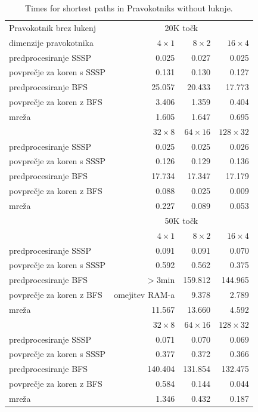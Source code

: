\documentclass[a4paper, 12pt]{book}
\begin{document}
\begin{table}
\begin{center}
\begin{tabular}{l*{3}{r}}
Pravokotnik brez lukenj & \multicolumn{3}{c}{20K točk}\\						
dimenzije pravokotnika	&	$4\times 1$	&	$8\times 2$	&	$16\times 4$ \\
\hline
predprocesiranje SSSP	&	0.025	&	0.027	&	0.025		\\
povprečje za koren s SSSP	&	0.131	&	0.130	&	0.127		\\
predprocesiranje BFS 	&	25.057	&	20.433	&	17.773		\\
povprečje za koren z BFS	&	3.406	&	1.359	&	0.404		\\
mreža	&	1.605	&	1.647	&	0.695	\vspace{.2cm}	\\

&	$32\times 8$	&	$64\times 16$	&	$128\times 32$	\\
\hline
predprocesiranje SSSP &	0.025	&	0.025	&	0.026 \\
povprečje za koren s SSSP &	0.126	&	0.129	&	0.136 \\
predprocesiranje BFS &	17.734	&	17.347	&	17.179 \\
povprečje za koren z BFS &	0.088	&	0.025	&	0.009 \\
mreža &	0.227	&	0.089	&	0.053 \vspace{.2cm} \\
\hline
  & \multicolumn{3}{c}{50K točk}  \\						
&	$4\times 1$	&	$8\times 2$	&	$16\times 4$ \\
\hline
predprocesiranje SSSP	&	0.091	&	0.091	&	0.070		\\
povprečje za koren s SSSP	&	0.592	&	0.562	&	0.375		\\
predprocesiranje BFS	&	$>$3min	&	159.812	&	144.965		\\
povprečje za koren z BFS	& omejitev RAM-a & 9.378	&	2.789		\\
mreža				&	11.567	&	13.660	&	4.592	\\

&	$32\times 8$	&	$64\times 16$	&	$128\times 32$	\\
\hline
predprocesiranje SSSP &	0.071	&	0.070	&	0.069 \\
povprečje za koren s SSSP &	0.377	&	0.372	&	0.366 \\
predprocesiranje BFS &	140.404	&	131.854	&	132.475 \\
povprečje za koren z BFS &	0.584	&	0.144	&	0.044 \\
mreža &	1.346	&	0.432	&	0.187
\end{tabular}
\caption{Times for shortest paths in Pravokotniks without luknje.}
\label{table1}
\end{center}
\end{table}
\end{document}
